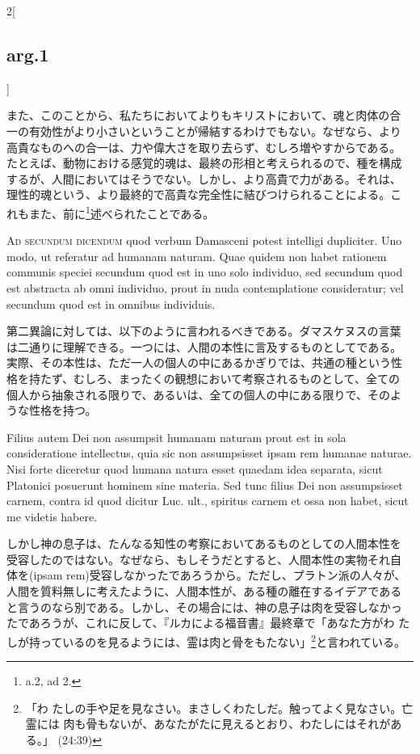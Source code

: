 \documentclass[paper=a4paper,fontsize=10pt,jafontsize=9pt,titlepage]{jlreq}
\begin{document}
\begin{paracol}{2}[\subsection{arg.1}]
\switchcolumn

また、このことから、私たちにおいてよりもキリストにおいて、魂と肉体の合
一の有効性がより小さいということが帰結するわけでもない。なぜなら、より
高貴なものへの合一は、力や偉大さを取り去らず、むしろ増やすからである。
たとえば、動物における感覚的魂は、最終の形相と考えられるので、種を構成
するが、人間においてはそうでない。しかし、より高貴で力がある。それは、
理性的魂という、より最終的で高貴な完全性に結びつけられることによる。こ
れもまた、前に\footnote{a.2, ad 2.}述べられたことである。

\switchcolumn*[\subsection{ad.2}]

{\scshape Ad secundum dicendum} quod verbum Damasceni potest intelligi
dupliciter. Uno modo, ut referatur ad humanam naturam. Quae quidem non
habet rationem communis speciei secundum quod est in uno solo
individuo, sed secundum quod est abstracta ab omni individuo, prout in
nuda contemplatione consideratur; vel secundum quod est in omnibus
individuis.

\switchcolumn

第二異論に対しては、以下のように言われるべきである。ダマスケヌスの言葉
は二通りに理解できる。一つには、人間の本性に言及するものとしてである。
実際、その本性は、ただ一人の個人の中にあるかぎりでは、共通の種という性
格を持たず、むしろ、まったくの観想において考察されるものとして、全ての
個人から抽象される限りで、あるいは、全ての個人の中にある限りで、そのよ
うな性格を持つ。

\switchcolumn*

Filius autem Dei non assumpsit humanam naturam prout est in sola
consideratione intellectus, quia sic non assumpsisset ipsam rem
humanae naturae. Nisi forte diceretur quod humana natura esset quaedam
idea separata, sicut Platonici posuerunt hominem sine materia. Sed
tunc filius Dei non assumpsisset carnem, contra id quod dicitur
Luc. ult., spiritus carnem et ossa non habet, sicut me videtis habere.

\switchcolumn

しかし神の息子は、たんなる知性の考察においてあるものとしての人間本性を
受容したのではない。なぜなら、もしそうだとすると、人間本性の実物それ自
体を(ipsam rem)受容しなかったであろうから。ただし、プラトン派の人々が、
人間を質料無しに考えたように、人間本性が、ある種の離在するイデアである
と言うのなら別である。しかし、その場合には、神の息子は肉を受容しなかっ
たであろうが、これに反して、『ルカによる福音書』最終章で「あなた方がわ
たしが持っているのを見るようには、霊は肉と骨をもたない」\footnote{「わ
たしの手や足を見なさい。まさしくわたしだ。触ってよく見なさい。亡霊には
肉も骨もないが、あなたがたに見えるとおり、わたしにはそれがある。」
(24:39)}と言われている。


\end{paracol}
\end{document}
